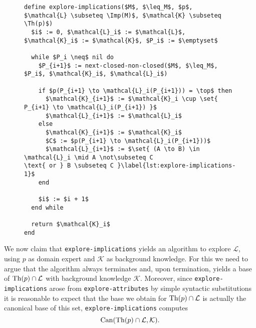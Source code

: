 \begin{figure}[tp]
  \centering
  \begin{Algorithm}
    \label{alg:explore-implications}
    \hspace*{0cm}
\begin{lstlisting}
define explore-implications($M$, $\leq_M$, $p$, $\mathcal{L} \subseteq \Imp(M)$, $\mathcal{K} \subseteq \Th(p)$)
  $i$ := 0, $\mathcal{L}_i$ := $\mathcal{L}$, $\mathcal{K}_i$ := $\mathcal{K}$, $P_i$ := $\emptyset$

  while $P_i \neq$ nil do
    $P_{i+1}$ := next-closed-non-closed($M$, $\leq_M$, $P_i$, $\mathcal{K}_i$, $\mathcal{L}_i$)

    if $p(P_{i+1} \to \mathcal{L}_i(P_{i+1})) = \top$ then
      $\mathcal{K}_{i+1}$ := $\mathcal{K}_i \cup \set{ P_{i+1} \to \mathcal{L}_i(P_{i+1}) }$
      $\mathcal{L}_{i+1}$ := $\mathcal{L}_i$
    else
      $\mathcal{K}_{i+1}$ := $\mathcal{K}_i$
      $C$ := $p(P_{i+1} \to \mathcal{L}_i(P_{i+1}))$
      $\mathcal{L}_{i+1}$ := $\set{ (A \to B) \in \mathcal{L}_i \mid A \not\subseteq C
\text{ or } B \subseteq C }\label{lst:explore-implications-1}$
    end

    $i$ := $i + 1$
  end while

  return $\mathcal{K}_i$  
end
\end{lstlisting}
  \end{Algorithm}
\end{figure}

We now claim that \lstinline{explore-implications} yields an algorithm to explore
$\mathcal{L}$, using $p$ as domain expert and $\mathcal{K}$ as background knowledge.  For
this we need to argue that the algorithm always terminates and, upon termination, yields a
base of $\operatorname{Th}(p) \cap \mathcal{L}$ with background knowledge $\mathcal{K}$.  Moreover,
since \lstinline{explore-implications} arose from \lstinline{explore-attributes} by simple
syntactic substitutions it is reasonable to expect that the base we obtain for $\operatorname{Th}(p)
\cap \mathcal{L}$ is actually the canonical base of this set, \ie
\lstinline{explore-implications} computes
\begin{equation*}
  \operatorname{Can}(\operatorname{Th}(p) \cap \mathcal{L}, \mathcal{K}).
\end{equation*}

